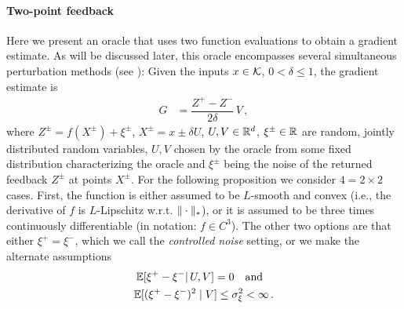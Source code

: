 \paragraph{Two-point feedback}
Here we present an oracle that uses two function evaluations to obtain a gradient estimate.
As will be discussed later, this oracle
 encompasses several simultaneous perturbation methods (see \cite{bhatnagar-book}):
Given the inputs $x\in \mathcal{K}$,  $0<\delta\le 1$,
the gradient estimate is
\begin{align}
G &=  \dfrac{Z^+ - Z^-}{2\delta}\, V \,, 
 \label{eq:twosp}
\end{align}
where $Z^{\pm} = f(X^{\pm}) + \xi^{\pm}$, $X^{\pm} = x \pm \delta U$, $U,V\in \mathbb{R}^d$, $\xi^{\pm}\in \mathbb{R}$ are random, jointly distributed random variables, $U,V$ chosen by the oracle
from some fixed distribution characterizing the oracle and $\xi^{\pm}$ being the noise of the returned feedback $Z^{\pm}$ at points $X^{\pm}$.
For the following proposition we consider $4=2\times 2$ cases.
First, the function is either assumed to be $L$-smooth and convex (i.e., the derivative of $f$ is $L$-Lipschitz w.r.t. $\|\cdot\|_*$), or it is assumed to be three times continuously differentiable (in notation: $f\in C^3$).
The other two options are that either $\xi^+=\xi^-$, which we call the \emph{controlled noise} setting, or we make the alternate assumptions
\begin{align}
\mathbb{E}[\xi^+-\xi^- |\, U,V] = 0 \text{~~ and ~~}\nonumber\\
\mathbb{E} [ (\xi^{+} - \xi^-)^{2} \mid V] \le \sigma_\xi^2 <\infty\,.
\label{eq:noiseass}
\end{align}

